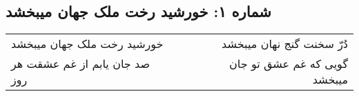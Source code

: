 \begin{center}
\section*{شماره ۱: خورشید رخت ملک جهان میبخشد}
\label{sec:001}
\begin{longtable}{l p{0.5cm} r}
خورشید رخت ملک جهان میبخشد
&&
دُرّ سخنت گنج نهان میبخشد
\\
صد جان یابم از غم عشقت هر روز
&&
گویی که غم عشق تو جان میبخشد
\\
\end{longtable}
\end{center}
